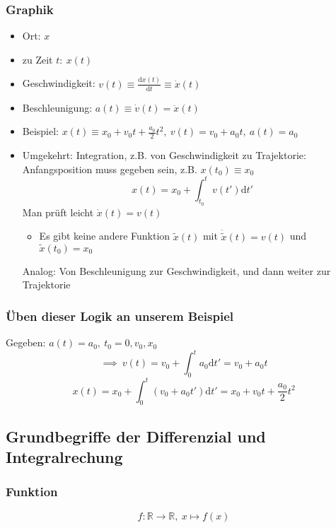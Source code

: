 \documentclass[a4paper]{scrartcl}
\theoremstyle{definition}
\theoremstyle{plain}
\theoremstyle{remark}
\theoremstyle{remark}
\begin{document}
\subsubsection{Graphik}
\label{sec-2-1-1}
\begin{itemize}
\item Ort: $x$
\item zu Zeit $t:~x(t)$
\item Geschwindigkeit: $v(t) \equiv \frac{\mathrm{d}x(t)}{\mathrm{d}t} \equiv \dot{x}(t)$
\item Beschleunigung: $a(t) \equiv \dot{v}(t) = \ddot{x}(t)$
\item Beispiel: $x(t) \equiv x_0 + v_0 t + \frac{a_0}{2}t^2, ~v(t) = v_0 + a_0 t,~a(t) = a_0$
\item Umgekehrt: Integration, z.B. von Geschwindigkeit zu Trajektorie: Anfangsposition muss gegeben sein, z.B. $x(t_0) \equiv x_0$
         \[x(t)=x_0 + \int_{t_0}^{t}v(t')\mathrm{d}t'\]
         Man prüft leicht $\dot{x}(t) = v(t)$
\begin{itemize}
\item Es gibt keine andere Funktion $\tilde{x}(t)$ mit $\dot{\tilde{x}}(t) = v(t)$ und $\tilde{x}(t_0) = x_0$
\end{itemize}
Analog: Von Beschleunigung zur Geschwindigkeit, und dann weiter zur Trajektorie
\end{itemize}
\subsubsection{Üben dieser Logik an unserem Beispiel}
\label{sec-2-1-2}
Gegeben: $a(t) = a_0,~t_0=0,v_0,x_0$ \\
        \[\implies~v(t) = v_0 + \int_0^t a_0\mathrm{d}t' = v_0 + a_0 t\]
\[x(t) = x_0 + \int_0^t (v_0 + a_0 t')\mathrm{d}t' = x_0 + v_0 t + \frac{a_0}{2}t^2\]
\subsection{Grundbegriffe der Differenzial und Integralrechung}
\label{sec-2-2}
\subsubsection{Funktion}
\label{sec-2-2-1}
\[f: \mathbb{R} \rightarrow \mathbb{R},~x \mapsto f(x)\]
\end{document}
